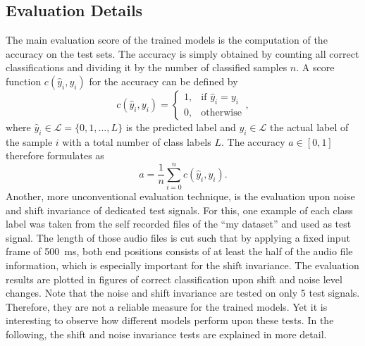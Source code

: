 \subsection{Evaluation Details}\label{sec:exp_details_tb}
The main evaluation score of the trained models is the computation of the accuracy on the test sets.
The accuracy is simply obtained by counting all correct classifications and dividing it by the number of classified samples $n$.
A score function $c(\hat{y}_i, y_i)$ for the accuracy can be defined by
\begin{equation}
  c(\hat{y}_i, y_i) = 
  \begin{cases}
    1, & \text{if } \hat{y}_i = y_i\\
    0, & \text{otherwise} 
  \end{cases},
\end{equation}
where $\hat{y}_i \in \mathcal{L} = \{0, 1, \dots, L\} $ is the predicted label and $y_i \in \mathcal{L}$ the actual label of the sample $i$ with a total number of class labels $L$.
The accuracy $a \in [0, 1]$ therefore formulates as
\begin{equation}
  a = \frac{1}{n} \sum_{i=0}^n c(\hat{y}_i, y_i).
\end{equation}
Another, more unconventional evaluation technique, is the evaluation upon noise and shift invariance of dedicated test signals.
For this, one example of each class label was taken from the self recorded files of the \enquote{my dataset} and used as test signal.
The length of those audio files is cut such that by applying a fixed input frame of \SI{500}{\milli\second}, both end positions consists of at least the half of the audio file information, which is especially important for the shift invariance.
The evaluation results are plotted in figures of correct classification upon shift and noise level changes.
Note that the noise and shift invariance are tested on only 5 test signals.
Therefore, they are not a reliable measure for the trained models.
Yet it is interesting to observe how different models perform upon these tests.
In the following, the shift and noise invariance tests are explained in more detail.



